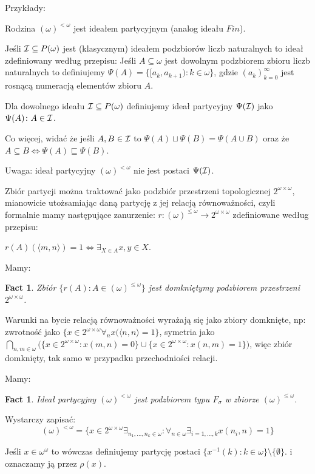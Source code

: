 \documentclass[12pt]{article}
\theoremstyle{plain}
\newtheorem{fact}[theorem]{Fact}
\theoremstyle{definition}
\theoremstyle{remark}
\newcommand{\cI}{{\cal I}}
\newcommand{\Part}{(\omega)^{\leq\omega}}
\newcommand{\FinPart}{(\omega)^{<\omega}}
\begin{document}
Przykłady:

Rodzina $\FinPart$ jest ideałem partycyjnym (analog ideału $Fin$).

Jeśli $\cI\subseteq P(\omega)$ jest (klasycznym) ideałem 
podzbiorów liczb naturalnych to ideał zdefiniowany 
według przepisu: 
Jeśli $A\subseteq\omega$ jest dowolnym podzbiorem
zbioru liczb naturalnych
to definiujemy $\Psi(A) = 
\{[a_k, a_{k+1}) \colon k\in\omega\}$, gdzie
$(a_k)_{k=0}^{\infty}$ jest rosnącą numeracją
elementów zbioru $A$.

Dla dowolnego ideału $\cI \subseteq P(\omega)$
definiujemy ideał partycyjny 
$\Psi(\cI)$ jako $\Psi(A)\colon A\in\cI$.

Co więcej, widać że jeśli $A,B\in\cI$ to
$\Psi(A)\sqcup \Psi(B) = \Psi(A \cup B)$
oraz że $A \subseteq B \iff \Psi(A) \sqsubseteq \Psi(B)$.

Uwaga: ideał partycyjny $\FinPart$ nie jest postaci
$\Psi(\cI)$.

Zbiór partycji można traktować jako podzbiór przestrzeni
topologicznej $2^{\omega\times\omega}$, mianowicie
utożsamiając daną partycję z jej relacją równoważności,
czyli formalnie mamy następujące zanurzenie:
$r\colon\Part\to 2^{\omega\times\omega}$
zdefiniowane według przepisu:

$r(A)(\langle m,n\rangle) = 1 \iff \exists_{X\in A} x, y \in X$.

Mamy:
\begin{fact}
Zbiór $\{r(A)\colon A\in\Part\}$ jest domkniętymy podzbiorem 
przestrzeni $2^{\omega\times\omega}$.
\end{fact}
\proof
Warunki na bycie relacją równoważności wyrażają się
jako zbiory domknięte, np:
zwrotność jako $\{x\in 2^{\omega\times\omega} \forall_{n} x(\langle n, n
\rangle = 1\}$, symetria jako 
$\bigcap_{n,m\in\omega} \big(\{x\in 2^{\omega\times\omega}\colon 
x(m,n) = 0 \} \cup \{x\in 2^{\omega\times\omega} 
\colon x(n,m) = 1\}\big)$, więc zbiór domknięty, tak
samo w przypadku przechodniości relacji.

Mamy:
\begin{fact}
Ideał partycyjny $\FinPart$ jest podzbiorem
typu $F_{\sigma}$ w zbiorze $\Part$.
\end{fact}
\proof
Wystarczy zapisać:
\[\FinPart = \{
x\in 2^{\omega\times\omega}
\exists_{n_1,\ldots,n_k\in\omega}\colon
\forall_{n\in\omega} \exists_{i=1,\ldots,k}
x(n_i,n) = 1
\}\]

Jeśli $x \in \omega^\omega$ to wówczas definiujemy
partycję postaci 
$\{ x^{-1}(k)\colon k\in\omega \} \setminus \{\emptyset\}$.
i oznaczamy ją przez $\rho(x)$.
\end{document}
